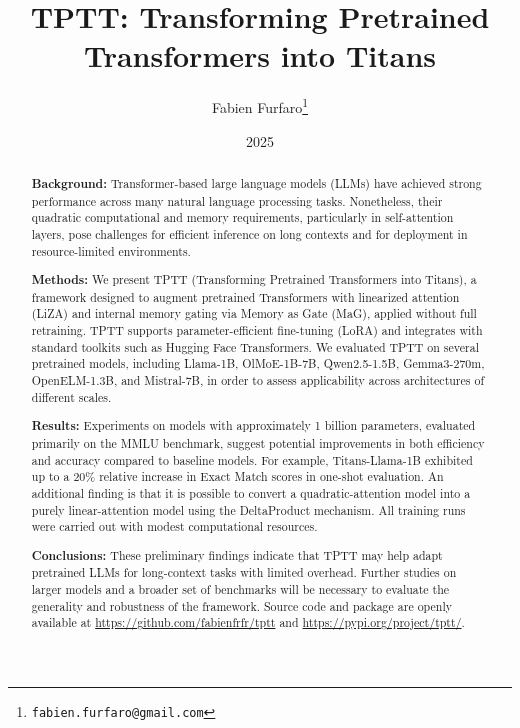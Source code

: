 \documentclass[10pt,a4paper]{article}
\title{\Large\textbf{TPTT: Transforming Pretrained Transformers into Titans}}
\author{\large Fabien Furfaro\thanks{\texttt{fabien.furfaro@gmail.com}}}
\date{\large 2025}
\begin{document}
\maketitle
    
\begin{abstract}
    \textbf{Background:} Transformer-based large language models (LLMs) have achieved strong performance across many natural language processing tasks. Nonetheless, their quadratic computational and memory requirements, particularly in self-attention layers, pose challenges for efficient inference on long contexts and for deployment in resource-limited environments.

    \textbf{Methods:} We present TPTT (Transforming Pretrained Transformers into Titans), a framework designed to augment pretrained Transformers with linearized attention (LiZA) and internal memory gating via Memory as Gate (MaG), applied without full retraining. TPTT supports parameter-efficient fine-tuning (LoRA) and integrates with standard toolkits such as Hugging Face Transformers. We evaluated TPTT on several pretrained models, including Llama-1B, OlMoE-1B-7B, Qwen2.5-1.5B, Gemma3-270m, OpenELM-1.3B, and Mistral-7B, in order to assess applicability across architectures of different scales.

    \textbf{Results:} Experiments on models with approximately 1 billion parameters, evaluated primarily on the MMLU benchmark, suggest potential improvements in both efficiency and accuracy compared to baseline models. For example, Titans-Llama-1B exhibited up to a 20\% relative increase in Exact Match scores in one-shot evaluation. An additional finding is that it is possible to convert a quadratic-attention model into a purely linear-attention model using the DeltaProduct mechanism. All training runs were carried out with modest computational resources.

    \textbf{Conclusions:} These preliminary findings indicate that TPTT may help adapt pretrained LLMs for long-context tasks with limited overhead. Further studies on larger models and a broader set of benchmarks will be necessary to evaluate the generality and robustness of the framework. Source code and package are openly available at \url{https://github.com/fabienfrfr/tptt} and \url{https://pypi.org/project/tptt/}.
\end{abstract}
\end{document}
